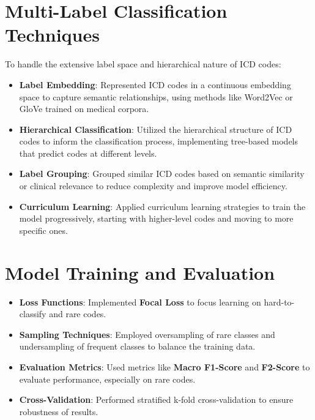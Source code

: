 \documentclass[12pt,a4paper]{report}
\begin{document}
\section{Multi-Label Classification Techniques}
To handle the extensive label space and hierarchical nature of ICD codes:

\begin{itemize}
    \item \textbf{Label Embedding}: Represented ICD codes in a continuous embedding space to capture semantic relationships, using methods like Word2Vec or GloVe trained on medical corpora.
    \item \textbf{Hierarchical Classification}: Utilized the hierarchical structure of ICD codes to inform the classification process, implementing tree-based models that predict codes at different levels.
    \item \textbf{Label Grouping}: Grouped similar ICD codes based on semantic similarity or clinical relevance to reduce complexity and improve model efficiency.
    \item \textbf{Curriculum Learning}: Applied curriculum learning strategies to train the model progressively, starting with higher-level codes and moving to more specific ones.
\end{itemize}

\section{Model Training and Evaluation}
\begin{itemize}
    \item \textbf{Loss Functions}: Implemented \textbf{Focal Loss} to focus learning on hard-to-classify and rare codes.
    \item \textbf{Sampling Techniques}: Employed oversampling of rare classes and undersampling of frequent classes to balance the training data.
    \item \textbf{Evaluation Metrics}: Used metrics like \textbf{Macro F1-Score} and \textbf{F2-Score} to evaluate performance, especially on rare codes.
    \item \textbf{Cross-Validation}: Performed stratified k-fold cross-validation to ensure robustness of results.
\end{itemize}
\end{document}
